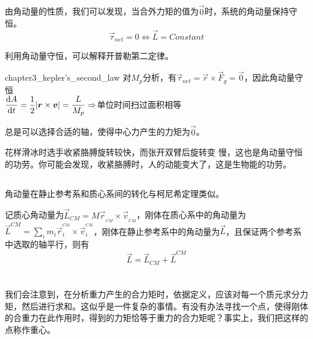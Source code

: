 \subsection[角动量守恒]{}
\begin{Itemize}
	\item {}由角动量的性质，我们可以发现，当合外力矩的值为$\vec{0}$时，系统的角动量保持守恒。
	\[\vec{\tau}_{net}=0\Leftrightarrow\vec{L}=Constant\]
\end{Itemize}
利用角动量守恒，可以解释开普勒第二定律。
\begin{singlefigure}{chapter3_kepler's_second_law}
	对$M_p$分析，有$\vec{\tau}_{net}=\vec{r}\times\vec{F}_g=\vec{0}$，因此角动量守恒\\[1ex]
	$\dfrac{\dif A}{\dif t}=\dfrac{1}{2}|\vec{r}\times\vec{v}|=\dfrac{L}{M_p}\Rightarrow$单位时间扫过面积相等
\end{singlefigure}
	
	总是可以选择合适的轴，使得中心力产生的力矩为$\vec{0}$。
	
	花样滑冰时选手收紧胳膊旋转较快，而张开双臂后旋转变
	慢，这也是角动量守恒的功劳。你可能会发现，收紧胳膊时，人的动能变大了，这是生物能的功劳。
\subsection[质心系转化]{}
角动量在静止参考系和质心系间的转化与柯尼希定理类似。
\begin{law}
	记质心角动量为$\vec{L}_{CM}=M\vec{r}_{_{CM}}\times\vec{v}_{_{CM}}$，刚体在质心系中的角动量为$\vec{L}^{CM}=\sum_im_i\vec{r}_i^{^{CM}}\times\vec{v}^{^{CM}}_i$，刚体在静止参考系中的角动量为$\vec{L}$，且保证两个参考系中选取的轴平行，则有
	\[\vec{L}=\vec{L}_{CM}+\vec{L}^{CM}\]
\end{law}
\section[重心]{}
我们会注意到，在分析重力产生的合力矩时，依据定义，应该对每一个质元求分力矩，然后进行求和。这似乎是一件复杂的事情。有没有办法寻找一个点，使得刚体的合重力在此作用时，得到的力矩恰等于重力的合力矩呢？事实上，我们把这样的点称作重心。

